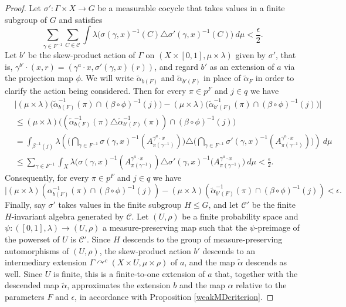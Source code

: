 \documentclass[12pt]{amsart}
\theoremstyle{definition}
\def\cal{\mathcal}
\newcommand{\acts}{\curvearrowright}
\newcommand{\symd}{\triangle}
\begin{document}
\begin{proof}
    Let $\sigma' : \Gamma \times X \rightarrow G$ be a measurable cocycle that takes values in a finite subgroup of $G$ and satisfies
    \[\sum_{\gamma \in F^{-1}} \sum_{C \in \cal C} \int \lambda \big(\sigma(\gamma,x)^{-1}(C) \symd \sigma'(\gamma, x)^{-1}(C) \big) \ d \mu < \frac{\epsilon}{2}.\]
    Let $b'$ be the skew-product action of $\Gamma$ on $(X \times [0,1], \mu \times \lambda)$ given by $\sigma'$, that is, $\gamma^{b'} \cdot (x, r) = (\gamma^a \cdot x, \sigma'(\gamma, x)(r))$, and regard $b'$ as an extension of $a$ via the projection map $\phi$. We will write $\tilde \alpha_{b(F)}$ and $\tilde \alpha_{b'(F)}$ in place of $\tilde \alpha_F$ in order to clarify the action being considered. Then for every $\pi \in p^F$ and $j \in q$ we have
    \begin{align*}
        & \big|(\mu \times \lambda)\big(\tilde \alpha_{b(F)}^{-1}(\pi) \cap (\beta \circ \phi)^{-1}(j)\big) - (\mu \times \lambda)\big(\tilde \alpha_{b'(F)}^{-1}(\pi) \cap (\beta \circ \phi)^{-1}(j)\big)\big|\\
        & \leq (\mu \times \lambda)\big((\tilde \alpha_{b(F)}^{-1}(\pi) \symd \tilde \alpha_{b'(F)}^{-1}(\pi)) \cap (\beta \circ \phi)^{-1}(j)\big)\\
        & = \int_{\beta^{-1}(j)} \lambda \left(\Bigg(\bigcap_{\gamma \in F^{-1}} \sigma(\gamma,x)^{-1}(A_{\pi(\gamma^{-1})}^{\gamma^a \cdot x}) \Bigg) \symd \Bigg(\bigcap_{\gamma \in F^{-1}} \sigma'(\gamma, x)^{-1}(A_{\pi(\gamma^{-1})}^{\gamma^a \cdot x}) \Bigg) \right) \ d \mu\\
        & \leq \sum_{\gamma \in F^{-1}} \int_X \lambda \Big( \sigma(\gamma,x)^{-1}(A_{\pi(\gamma^{-1})}^{\gamma^a \cdot x}) \symd \sigma'(\gamma,x)^{-1}(A_{\pi(\gamma^{-1})}^{\gamma^a \cdot x} \Big) \ d \mu < \frac{\epsilon}{2}.
    \end{align*}
    Consequently, for every $\pi \in p^F$ and $j \in q$ we have
        \[|(\mu \times \lambda)(\alpha_{b(F)}^{-1}(\pi) \cap (\beta \circ \phi)^{-1}(j)) - (\mu \times \lambda)(\tilde \alpha_{b'(F)}^{-1}(\pi) \cap (\beta \circ \phi)^{-1}(j)) < \epsilon.\]
    Finally, say $\sigma'$ takes values in the finite subgroup $H \leq G$, and let $\cal C'$ be the finite $H$-invariant algebra generated by $\cal C$. Let $(U, \rho)$ be a finite probability space and $\psi : ([0,1], \lambda) \rightarrow (U, \rho)$ a measure-preserving map such that the $\psi$-preimage of the powerset of $U$ is $\cal C'$. Since $H$ descends to the group of measure-preserving automorphisms of $(U, \rho)$, the skew-product action $b'$ descends to an intermediary extension $\Gamma \acts^c (X \times U, \mu \times \rho)$ of $a$, and the map $\tilde \alpha$ descends as well. Since $U$ is finite, this is a finite-to-one extension of $a$ that, together with the descended map $\tilde \alpha$, approximates the extension $b$ and the map $\alpha$ relative to the parameters $F$ and $\epsilon$, in accordance with Proposition \ref{weakMDcriterion}.
\end{proof}
\end{document}
